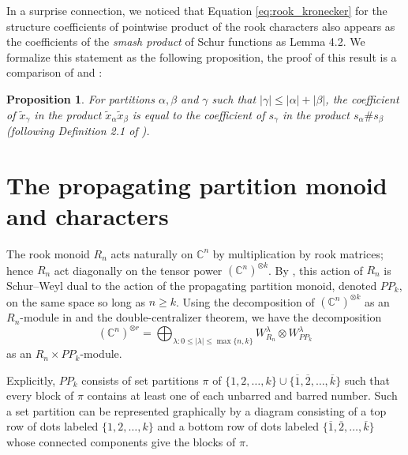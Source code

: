 \documentclass{amsart}
\newtheorem{prop}[lemma]{Proposition}
\theoremstyle{definition}
\newcommand{\C}{\mathbb{C}}
\newcommand{\PP}{P\!P}
\newcommand{\xt}{\tilde x}
\begin{document}
In a surprise connection, we noticed that Equation \eqref{eq:rook_kronecker}
for the structure coefficients of pointwise product of
the rook characters also appears as the coefficients of the {\it smash product}
of Schur functions \cite{Ying22} as Lemma 4.2.
We formalize this statement as the following proposition, the proof of this result is a comparison of \cite[Theorem 1]{MS25} and \cite[Lemma 4.2]{Ying22}:

\begin{prop}\label{prop:xtproduct_equals_smashproduct}
For partitions $\alpha, \beta$ and $\gamma$ such that $|\gamma| \leq |\alpha|+|\beta|$,
the coefficient of $\xt_\gamma$ in the product $\xt_\alpha \xt_\beta$
is equal to the coefficient of $s_\gamma$ in the product $s_\alpha \# s_\beta$
(following Definition 2.1 of \cite{Ying22}).
\end{prop}

\section{The propagating partition monoid and characters}
\label{sec:prop_partitions}

The rook monoid $R_n$ acts naturally on $\C^n$ by multiplication by rook matrices; hence $R_n$ act diagonally on
the tensor power $(\C^n)^{\otimes k}$. By \cite{KM2008}, this action of $R_n$ is Schur--Weyl
dual to the action of the propagating partition monoid, denoted $\PP_k$, on the same space so long as $n\geq k$.
Using the decomposition of $(\C^n)^{\otimes k}$ as an $R_n$-module in \cite[Example 3.18]{solomon2002rep} and the double-centralizer
theorem, we have the decomposition \begin{equation}\label{eq:SW_decomp}
	(\C^n)^{\otimes r}=\bigoplus_{\lambda:0\leq|\lambda|\leq\max\{n,k\}} W_{R_n}^\lambda\otimes W_{\PP_k}^\lambda
\end{equation} as an $R_n\times \PP_k$-module.

Explicitly, $\PP_k$ consists of set partitions $\pi$ of $\{1,2,\ldots,k\}\cup\{\overline1,\overline2,\ldots,\overline{k}\}$
such that every block of $\pi$ contains at least  one of each unbarred and barred number.
Such a set partition can be represented graphically
by a diagram consisting of a top row of dots labeled $\{1,2,\ldots,k\}$ and a bottom row of dots labeled
$\{\overline1,\overline2,\ldots,\overline{k}\}$ whose connected components give the blocks of $\pi$.
\end{document}
